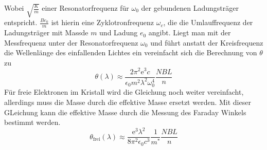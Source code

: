 Wobei $\sqrt{\frac{K}{m}}$ einer Resonatorfrequenz für $\omega_0$ der gebundenen Ladungsträger entspricht.
$\frac{Be_0}{m}$ ist hierin eine Zyklotronfrequenz $\omega_c$, die die Umlauffrequenz der Ladungsträger mit Massde $m$ und Ladung $e_0$ angibt.
Liegt man mit der Messfrequenz unter der Resonatorfrequenz $\omega_0$ und führt anstatt der Kreisfrequenz die Wellenlänge des einfallenden Lichtes ein vereinfacht sich die Berechnung von $\theta$ zu
\begin{equation*}
    \theta(\lambda) \approx \frac{2\pi^2 \text{e}^3c}{\epsilon_0m^2\lambda^2\omega_0^4} \frac{NBL}{n}
\end{equation*}
Für freie Elektronen im Kristall wird die Gleichung noch weiter vereinfacht, allerdings muss die Masse durch die effektive Masse ersetzt werden.
Mit dieser GLeichung kann die effektive Masse durch die Messung des Faraday Winkels bestimmt werden.
\begin{equation*}
    \theta_{\text{frei}}(\lambda) \approx \frac{\text{e}^3 \lambda^2}{8 \pi^2\epsilon_0 c^3} \frac{1}{m^{*}}\frac{NBL}{n}
\end{equation*}